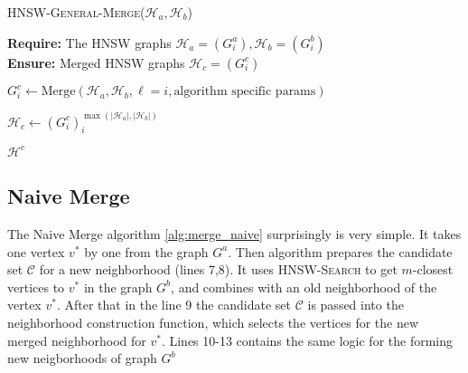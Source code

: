 \documentclass{article}
\begin{document}
\begin{algorithm}
\caption{\textsc{HNSW-General-Merge}($\mathcal{H}_a, \mathcal{H}_b$)}\label{alg:general_merge}
\textbf{Require:} The HNSW graphs $\mathcal{H}_a = (G^a_i), \mathcal{H}_b = (G^b_i)$ \\
\textbf{Ensure:}  Merged HNSW graphs $\mathcal{H}_c = (G^c_i)$ 
\begin{algorithmic}[1]

    \State $G^c_i \gets \text{Merge}(\mathcal{H}_a, \mathcal{H}_b, \ell=i, \text{algorithm specific params})$
\EndFor

\State $\mathcal{H}_c \gets (G^c_i)_i^{\max(|\mathcal{H}_a|, |\mathcal{H}_b|)}$

\State \Return $\mathcal{H}^c$
\end{algorithmic}
\end{algorithm}

\subsection{Naive Merge}
The Naive Merge algorithm \ref{alg:merge_naive} surprisingly is very simple. It takes one vertex $v^*$ by one from the graph $G^a$. Then algorithm prepares the candidate set $\mathcal{C}$ for a new neighborhood (lines 7,8). It uses \textsc{HNSW-Search} to get $m$-closest vertices to $v^*$ in the graph $G^b$, and combines with an old neighborhood of the vertex $v^*$. After that in the line 9 the candidate set $\mathcal{C}$ is passed into the neighborhood construction function, which selects the vertices for the new merged neighborhood for $v^*$.
Lines 10-13 contains the same logic for the forming new neigborhoods of graph $G^b$
\end{document}
